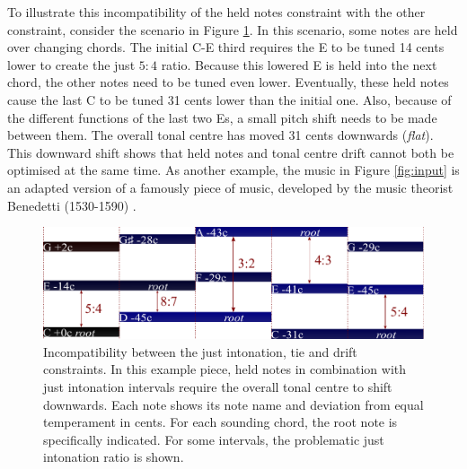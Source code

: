 \documentclass[a4paper]{article}
\begin{document}
To illustrate this incompatibility of the held notes constraint with the other constraint, consider the scenario in Figure \ref{fig:ties_vs_ji}. In this scenario, some notes are held over changing chords. The initial C-E third requires the E to be tuned 14 cents lower to create the just $5:4$ ratio. Because this lowered E is held into the next chord, the other notes need to be tuned even lower. Eventually, these held notes cause the last C to be tuned 31 cents lower than the initial one. Also, because of the different functions of the last two Es, a small pitch shift needs to be made between them. The overall tonal centre has moved 31 cents downwards (\textit{flat}). This downward shift shows that held notes and tonal centre drift cannot both be optimised at the same time. As another example, the music in Figure \ref{fig:input} is an adapted version of a famously  piece of music, developed by the music theorist Benedetti (1530-1590) \cite{devaney_study_2012}.

\begin{figure}
	\centering
	\includegraphics[width=\linewidth]{Figures/ties_vs_ji.pdf}
	\caption{Incompatibility between the just intonation, tie and drift constraints. In this example piece, held notes in combination with just intonation intervals require the overall tonal centre to shift downwards. Each note shows its note name and deviation from equal temperament in cents. For each sounding chord, the root note is specifically indicated. For some intervals, the problematic just intonation ratio is shown.}
	\label{fig:ties_vs_ji}
\end{figure}
\end{document}
